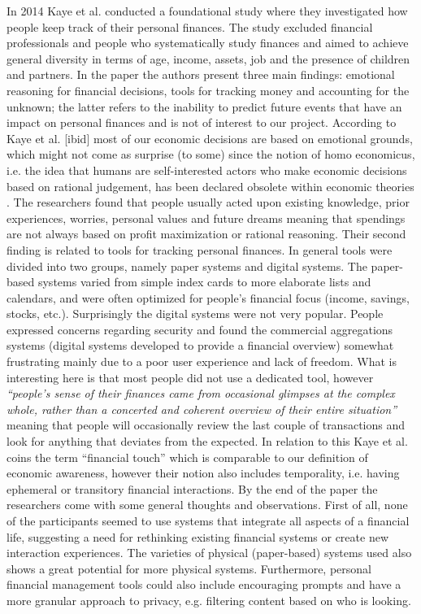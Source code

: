 In 2014 Kaye et al. \cite{kaye2014money} conducted a foundational study where they investigated how people keep track of their personal finances. The study excluded financial professionals and people who systematically study finances and aimed to achieve general diversity in terms of age, income, assets, job and the presence of children and partners. In the paper the authors present three main findings: emotional reasoning for financial decisions, tools for tracking money and accounting for the unknown; the latter refers to the inability to predict future events that have an impact on personal finances and is not of interest to our project. According to Kaye et al. [ibid] most of our economic decisions are based on emotional grounds, which might not come as surprise (to some) since the notion of homo economicus, i.e. the idea that humans are self-interested actors who make economic decisions based on rational judgement, has been declared obsolete within economic theories \cite{REFERENCE}. The researchers found that people usually acted upon existing knowledge, prior experiences, worries, personal values and future dreams meaning that spendings are not always based on profit maximization or rational reasoning.
Their second finding is related to tools for tracking personal finances. In general tools were divided into two groups, namely paper systems and digital systems. The paper-based systems varied from simple index cards to more elaborate lists and calendars, and were often optimized for people’s financial focus (income, savings, stocks, etc.). Surprisingly the digital systems were not very popular. People expressed concerns regarding security and found the commercial aggregations systems (digital systems developed to provide a financial overview) somewhat frustrating mainly due to a poor user experience and lack of freedom. What is interesting here is that most people did not use a dedicated tool, however \emph{“people’s sense of their finances came from occasional glimpses at the complex whole, rather than a concerted and coherent overview of their entire situation”} \cite[p.~562]{kaye2014money} meaning that people will occasionally review the last couple of transactions and look for anything that deviates from the expected. In relation to this Kaye et al. coins the term “financial touch” which is comparable to our definition of economic awareness, however their notion also includes temporality, i.e. having ephemeral or transitory financial interactions.
By the end of the paper the researchers come with some general thoughts and observations. First of all, none of the participants seemed to use systems that integrate all aspects of a financial life, suggesting a need for rethinking existing financial systems or create new interaction experiences. The varieties of physical (paper-based) systems used also shows a great potential for more physical systems. Furthermore, personal financial management tools could also include encouraging prompts and have a more granular approach to privacy, e.g. filtering content based on who is looking.

